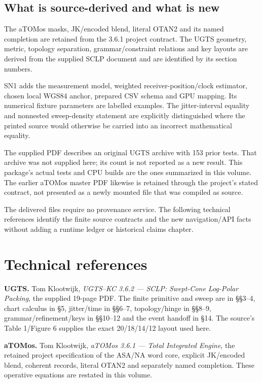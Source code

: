 \documentclass[11pt,a4paper]{article}
\begin{document}
\subsection{What is source-derived and what is new}
The aTOMos masks, JK/encoded blend, literal OTAN2 and its named completion are retained from the 3.6.1
project contract. The UGTS geometry, metric, topology separation, grammar/constraint relations and key
layouts are derived from the supplied SCLP document and are identified by its section numbers.

SN1 adds the measurement model, weighted receiver-position/clock estimator, chosen local WGS84 anchor,
prepared CSV schema and GPU mapping. Its numerical fixture parameters are labelled examples. The
jitter-interval equality and nonnested sweep-density statement are explicitly distinguished where the printed
source would otherwise be carried into an incorrect mathematical equality.

The supplied PDF describes an original UGTS archive with 153 prior tests. That archive was not supplied here;
its count is not reported as a new result. This package's actual tests and CPU builds are the ones summarized
in this volume. The earlier aTOMos master PDF likewise is retained through the project's stated contract,
not presented as a newly mounted file that was compiled as source.

The delivered files require no provenance service. The following technical references identify the finite source
contracts and the new navigation/API facts without adding a runtime ledger or historical claims chapter.
\clearpage

\section*{Technical references}
\textbf{UGTS.} Tom Klootwijk, \emph{UGTS--KC 3.6.2 --- SCLP: Swept-Cone Log-Polar Packing},
the supplied 19-page PDF. The finite primitive and sweep are in \S\S3--4, chart calculus in \S5, jitter/time in
\S\S6--7, topology/hinge in \S\S8--9, grammar/refinement/keys in \S\S10--12 and the event handoff in \S14.
The source's Table 1/Figure 6 supplies the exact 20/18/14/12 layout used here.

\textbf{aTOMos.} Tom Klootwijk, \emph{aTOMos 3.6.1 --- Total Integrated Engine}, the retained project
specification of the ASA/NA word core, explicit JK/encoded blend, coherent records, literal OTAN2 and
separately named completion. These operative equations are restated in this volume.
\end{document}
